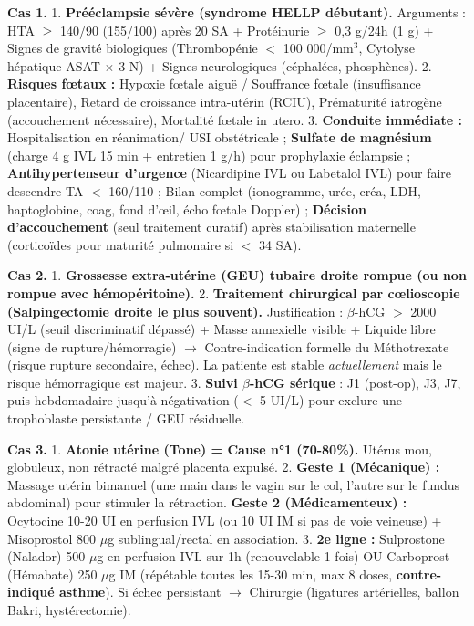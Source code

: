 \documentclass[11pt]{article}
\begin{document}
\begin{corrige}
\textbf{Cas 1.}
1. \textbf{Prééclampsie sévère (syndrome HELLP débutant).} Arguments : HTA $\ge$ 140/90 (155/100) après 20 SA + Protéinurie $\ge$ 0,3 g/24h (1 g) + Signes de gravité biologiques (Thrombopénie $<$ 100 000/mm$^3$, Cytolyse hépatique ASAT $\times$ 3 N) + Signes neurologiques (céphalées, phosphènes).
2. \textbf{Risques fœtaux :} Hypoxie fœtale aiguë / Souffrance fœtale (insuffisance placentaire), Retard de croissance intra-utérin (RCIU), Prématurité iatrogène (accouchement nécessaire), Mortalité fœtale in utero.
3. \textbf{Conduite immédiate :} Hospitalisation en réanimation/ USI obstétricale ; \textbf{Sulfate de magnésium} (charge 4 g IVL 15 min + entretien 1 g/h) pour prophylaxie éclampsie ; \textbf{Antihypertenseur d'urgence} (Nicardipine IVL ou Labetalol IVL) pour faire descendre TA $<$ 160/110 ; Bilan complet (ionogramme, urée, créa, LDH, haptoglobine, coag, fond d'œil, écho fœtale Doppler) ; \textbf{Décision d'accouchement} (seul traitement curatif) après stabilisation maternelle (corticoïdes pour maturité pulmonaire si $<$ 34 SA).

\textbf{Cas 2.}
1. \textbf{Grossesse extra-utérine (GEU) tubaire droite rompue (ou non rompue avec hémopéritoine).}
2. \textbf{Traitement chirurgical par cœlioscopie (Salpingectomie droite le plus souvent).} Justification : $\beta$-hCG $>$ 2000 UI/L (seuil discriminatif dépassé) + Masse annexielle visible + Liquide libre (signe de rupture/hémorragie) $\rightarrow$ Contre-indication formelle du Méthotrexate (risque rupture secondaire, échec). La patiente est stable \emph{actuellement} mais le risque hémorragique est majeur.
3. \textbf{Suivi $\beta$-hCG sérique} : J1 (post-op), J3, J7, puis hebdomadaire jusqu'à négativation ($<$ 5 UI/L) pour exclure une trophoblaste persistante / GEU résiduelle.

\textbf{Cas 3.}
1. \textbf{Atonie utérine (Tone) = Cause n°1 (70-80\%).} Utérus mou, globuleux, non rétracté malgré placenta expulsé.
2. \textbf{Geste 1 (Mécanique) :} Massage utérin bimanuel (une main dans le vagin sur le col, l'autre sur le fundus abdominal) pour stimuler la rétraction. \textbf{Geste 2 (Médicamenteux) :} Ocytocine 10-20 UI en perfusion IVL (ou 10 UI IM si pas de voie veineuse) + Misoprostol 800 $\mu$g sublingual/rectal en association.
3. \textbf{2e ligne :} Sulprostone (Nalador) 500 $\mu$g en perfusion IVL sur 1h (renouvelable 1 fois) OU Carboprost (Hémabate) 250 $\mu$g IM (répétable toutes les 15-30 min, max 8 doses, \textbf{contre-indiqué asthme}). Si échec persistant $\rightarrow$ Chirurgie (ligatures artérielles, ballon Bakri, hystérectomie).
\end{corrige}
\end{document}
